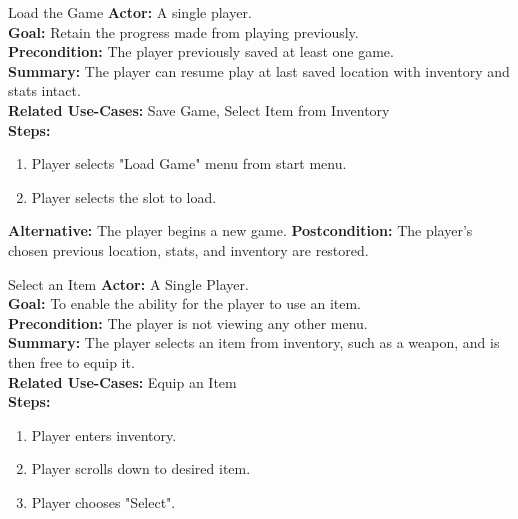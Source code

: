 \documentclass[12pt]{report}
\begin{document}
\begin{subsection}{Load the Game}
\textbf{Actor:} A single player. \\
\textbf{Goal:} Retain the progress made from playing previously. \\
\textbf{Precondition:} The player previously saved at least one game. \\
\textbf{Summary:} The player can resume play at last saved location with inventory and stats intact.  \\
\textbf{Related Use-Cases:} Save Game, Select Item from Inventory \\
\textbf{Steps:}
\begin{enumerate}
   \item Player selects "Load Game" menu from start menu.
   \item Player selects the slot to load.
\end{enumerate}
\textbf{Alternative:} The player begins a new game.
\textbf{Postcondition:} The player's chosen previous location, stats, and inventory are restored.
\end{subsection}

\begin{subsection}{Select an Item}
\textbf{Actor:} A Single Player. \\
\textbf{Goal:} To enable the ability for the player to use an item. \\
\textbf{Precondition:} The player is not viewing any other menu. \\
\textbf{Summary:} The player selects an item from inventory, such as a weapon, and is then free to equip it. \\
\textbf{Related Use-Cases:} Equip an Item \\
\textbf{Steps:}
\begin{enumerate}
   \item Player enters inventory.
   \item Player scrolls down to desired item.
   \item Player chooses "Select".
\end{enumerate}
\end{subsection}
\end{document}
